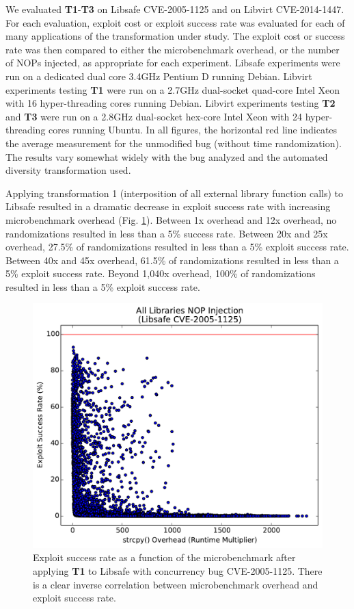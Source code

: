 We evaluated \textbf{T1}-\textbf{T3} on Libsafe CVE-2005-1125 and on Libvirt CVE-2014-1447.
For each evaluation, exploit cost or exploit success rate was evaluated for each of many applications of the transformation under study.
The exploit cost or success rate was then compared to either the microbenchmark overhead, or the number of NOPs injected, as appropriate for each experiment.
Libsafe experiments were run on a dedicated dual core 3.4GHz Pentium D running Debian.
Libvirt experiments testing \textbf{T1} were run on a 2.7GHz dual-socket quad-core Intel Xeon with 16 hyper-threading cores running Debian.
Libvirt experiments testing \textbf{T2} and \textbf{T3} were run on a 2.8GHz dual-socket hex-core Intel Xeon with 24 hyper-threading cores running Ubuntu.
In all figures, the horizontal red line indicates the average measurement for the unmodified bug (without time randomization).
The results vary somewhat widely with the bug analyzed and the automated diversity transformation used.

Applying transformation 1 (interposition of all external library function calls) to Libsafe resulted in a dramatic decrease in exploit success rate with increasing microbenchmark overhead (Fig. \ref{fig_libsafe-all}).
Between 1x overhead and 12x overhead, no randomizations resulted in less than a 5\% success rate.
Between 20x and 25x overhead, 27.5\% of randomizations resulted in less than a 5\% exploit success rate.
Between 40x and 45x overhead, 61.5\% of randomizations resulted in less than a 5\% exploit success rate.
Beyond 1,040x overhead, 100\% of randomizations resulted in less than a 5\% exploit success rate.
\begin{figure}
	\centering
	\includegraphics[width=.75\columnwidth]{figures/libsafe-all}
	\caption{Exploit success rate as a function of the microbenchmark after applying \textbf{T1} to Libsafe with concurrency bug CVE-2005-1125.
	There is a clear inverse correlation between microbenchmark overhead and exploit success rate.}
	\label{fig_libsafe-all}
\end{figure}

